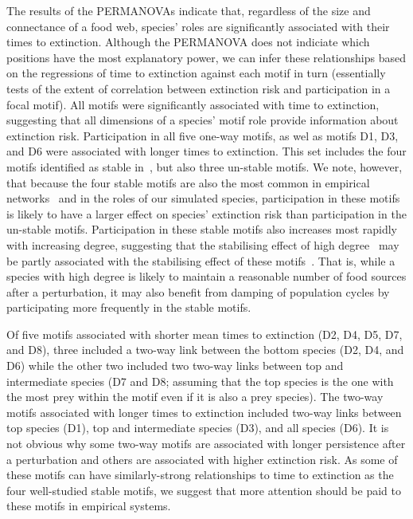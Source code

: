 \documentclass[12pt]{article}
\begin{document}
		The results of the PERMANOVAs indicate that, regardless of the size and connectance of a food web, species' roles are significantly associated with their times to extinction. 
		Although the PERMANOVA does not indiciate which positions have the most explanatory power, we can infer these relationships based on the regressions of time to extinction against each motif in turn (essentially tests of the extent of correlation between extinction risk and participation in a focal motif).
		All motifs were significantly associated with time to extinction, suggesting that all dimensions of a species' motif role provide information about extinction risk.
		Participation in all five one-way motifs, as wel as motifs D1, D3, and D6 were associated with longer times to extinction. 
		This set includes the four motifs identified as stable in~\citet{Stouffer2007,Borrelli2015a}, but also three un-stable motifs. 
		We note, however, that because the four stable motifs are also the most common in empirical networks~\citep{Stouffer2007} and in the roles of our simulated species, participation in these motifs is likely to have a larger effect on species' extinction risk than participation in the un-stable motifs.
		Participation in these stable motifs also increases most rapidly with increasing degree, suggesting that the stabilising effect of high degree~\citep{} may be partly associated with the stabilising effect of these motifs~\citep{Borrelli2015a}.
		That is, while a species with high degree is likely to maintain a reasonable number of food sources after a perturbation, it may also benefit from damping of population cycles by participating more frequently in the stable motifs.


		Of five motifs associated with shorter mean times to extinction (D2, D4, D5, D7, and D8),
		three included a two-way link between the bottom species (D2, D4, and D6) while the other two included two two-way links between top and intermediate species (D7 and D8; assuming that the top species is the one with the most prey within the motif even if it is also a prey species).
		The two-way motifs associated with longer times to extinction included two-way links between top species (D1), top and intermediate species (D3), and all species (D6).
		It is not obvious why some two-way motifs are associated with longer persistence after a perturbation and others are associated with higher extinction risk.
		As some of these motifs can have similarly-strong relationships to time to extinction as the four well-studied stable motifs, we suggest that more attention should be paid to these motifs in empirical systems.
\end{document}
